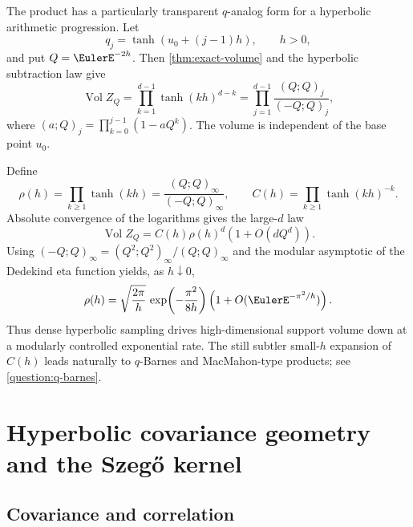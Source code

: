 \documentclass[11pt,a4paper]{article}
\theoremstyle{definition}
\theoremstyle{remark}
\newcommand{\Vol}{\operatorname{Vol}}
\begin{document}
The product has a particularly transparent $q$-analog form for a hyperbolic arithmetic progression.  Let
\[
  q_j=\tanh(u_0+(j-1)h),\qquad h>0,
\]
and put $Q=\EulerE^{-2h}$.  Then \cref{thm:exact-volume} and the hyperbolic subtraction law give
\begin{equation}
 \Vol Z_Q
  =\prod_{k=1}^{d-1}\tanh(kh)^{d-k}
  =\prod_{j=1}^{d-1}\frac{(Q;Q)_j}{(-Q;Q)_j},
 \label{eq:q-superfactorial}
\end{equation}
where $(a;Q)_j=\prod_{k=0}^{j-1}(1-aQ^k)$.  The volume is independent of the base point $u_0$.

Define
\begin{equation}
 \rho(h)=\prod_{k\ge1}\tanh(kh)
  =\frac{(Q;Q)_\infty}{(-Q;Q)_\infty},
 \qquad
 C(h)=\prod_{k\ge1}\tanh(kh)^{-k}.
 \label{eq:rho-C}
\end{equation}
Absolute convergence of the logarithms gives the large-$d$ law
\begin{equation}
  \Vol Z_Q=C(h)\rho(h)^d\left(1+O(dQ^d)\right).
  \label{eq:large-d-volume}
\end{equation}
Using $(-Q;Q)_\infty=(Q^2;Q^2)_\infty/(Q;Q)_\infty$ and the modular asymptotic of the Dedekind eta function yields, as $h\downarrow0$,
\begin{equation}
  \rho(h)
   =\sqrt{\frac{2\pi}{h}}\,
     \exp\!\left(-\frac{\pi^2}{8h}\right)
     \left(1+O(\EulerE^{-\pi^2/h})\right).
  \label{eq:rho-small-h}
\end{equation}
Thus dense hyperbolic sampling drives high-dimensional support volume down at a modularly controlled exponential rate.  The still subtler small-$h$ expansion of $C(h)$ leads naturally to $q$-Barnes and MacMahon-type products; see \cref{question:q-barnes}.


\section{Hyperbolic covariance geometry and the Szeg\H{o} kernel}
\label{sec:hyperbolic}

\subsection{Covariance and correlation}
\end{document}
